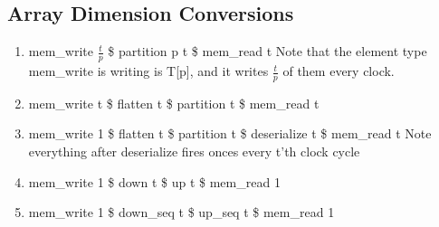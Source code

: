 \documentclass[11pt,fleqn]{article}
\numberwithin{equation}{subsection}
\begin{document}
\subsection{Array Dimension Conversions}
\begin{enumerate}
    \item mem\_write $\frac{t}{p}$ \$ partition p t \$ mem\_read t
        \subitem Note that the element type mem\_write is writing is T[p], 
        and it writes $\frac{t}{p}$ of them every clock.
    \item mem\_write t \$ flatten t \$ partition t \$ mem\_read t 
    \item mem\_write 1 \$ flatten t \$ partition t \$ deserialize t \$ mem\_read t
        \subitem Note everything after deserialize fires onces every t'th 
        clock cycle
    \item mem\_write 1 \$ down t \$ up t \$ mem\_read 1
    \item mem\_write 1 \$ down\_seq t \$ up\_seq t \$ mem\_read 1
\end{enumerate}
\end{document}

